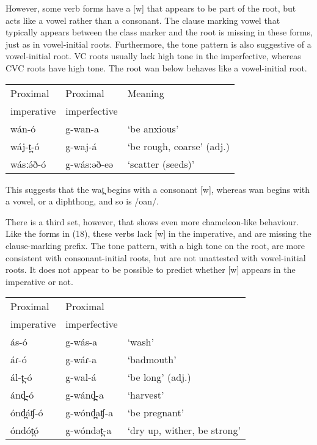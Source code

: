 However, some verb forms have a [w] that appears to be part of the root, but acts like a vowel rather than a consonant. The clause marking vowel that typically appears between the class marker and the root is missing in these forms, just as in vowel-initial roots. Furthermore, the tone pattern is also suggestive of a vowel-initial root. VC roots usually lack high tone in the imperfective, whereas CVC roots have high tone. The root wan below behaves like a vowel-initial root. 

\ea 
\begin{center}
\begin{tabular}[t]{lll}
	Proximal	&	Proximal 	&	Meaning\\ 
	imperative	&	imperfective \\
	wán-ó		&	g-wan-a		&	‘be anxious’ \\
	wáj-t̪-ó		&	g-waj-á		&	‘be rough, coarse’ (adj.) \\
	wásːə́ð-ó		&	g-wás:əð-eə	&	‘scatter (seeds)’ 
		\end{tabular}\label{ex:ch2:12}
\end{center}
\z

This suggests that the wat̪ begins with a consonant [w], whereas wan begins with a vowel, or a diphthong, and so is /oan/. 

There is a third set, however, that shows even more chameleon-like behaviour. Like the forms in (18), these verbs lack [w] in the imperative, and are missing the clause-marking prefix. The tone pattern, with a high tone on the root, are more consistent with consonant-initial roots, but are not unattested with vowel-initial roots. It does not appear to be possible to predict whether [w] appears in the imperative or not. 

\ea	
\begin{center}
\begin{tabular}[t]{lll}	
	Proximal	&	Proximal \\ 
	imperative	&	imperfective \\ 
	ás-ó		&	g-wás-a		&	‘wash’ \\ 
	áɾ-ó		&	g-wáɾ-a		&	‘badmouth’\\
	ál-t̪-ó		&	g-wal-á		&	‘be long’ (adj.) \\
	ánd̪-ó		&	g-wánd̪-a	&	‘harvest’ \\
	ónd̪áʧ-ó		&	g-wónd̪aʧ-a	&	‘be pregnant’ \\
	óndót̪ó		&	g-wóndət̪-a	&	‘dry up, wither, be strong’ 
		\end{tabular}\label{ex:ch2:12}
\end{center}
\z 

